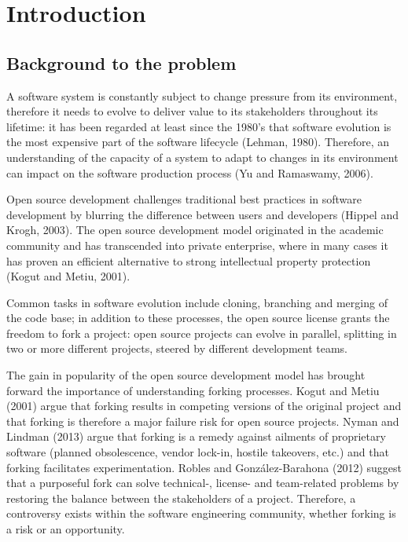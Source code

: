 
\chapter{Introduction} %

\label{Chapter1} %


\newcommand{\keyword}[1]{\textbf{#1}}
\newcommand{\tabhead}[1]{\textbf{#1}}
\newcommand{\code}[1]{\texttt{#1}}
\newcommand{\file}[1]{\texttt{\bfseries#1}}
\newcommand{\option}[1]{\texttt{\itshape#1}}


\section{Background to the problem}
A software system is constantly subject to change pressure from its environment, therefore it needs to evolve to deliver value to its stakeholders throughout its lifetime: it has been regarded at least since the 1980's that software evolution is the most expensive part of the software lifecycle (Lehman, 1980). Therefore, an understanding of the capacity of a system to adapt to changes in its environment can impact on the software production process (Yu and Ramaswamy, 2006).

Open source development challenges traditional best practices in software development by blurring the difference between users and developers (Hippel and Krogh, 2003). The open source development model originated in the academic community and has transcended into private enterprise, where in many cases it has proven an efficient alternative to strong intellectual property protection (Kogut and Metiu, 2001).

Common tasks in software evolution include cloning, branching and merging of the code base; in addition to these processes, the open source license grants the freedom to fork a project: open source projects can evolve in parallel, splitting in two or more different projects, steered by different development teams.

The gain in popularity of the open source development model has brought forward the importance of understanding forking processes. Kogut and Metiu (2001) argue that forking results in competing versions of the original project and that forking is therefore a major failure risk for open source projects. Nyman and Lindman (2013) argue that forking is a remedy against ailments of proprietary software (planned obsolescence, vendor lock-in, hostile takeovers, etc.) and that forking facilitates experimentation. Robles and González-Barahona (2012) suggest that a purposeful fork can solve technical-, license- and team-related problems by restoring the balance between the stakeholders of a project. Therefore, a controversy exists within the software engineering community, whether forking is a risk or an opportunity.

